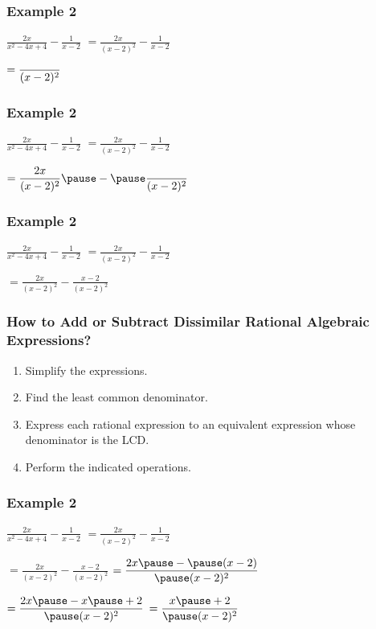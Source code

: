 \documentclass[14pt]{beamer}
\begin{document}
    \begin{frame}
    	\frametitle{Example 2}
    	$\displaystyle \frac{2x}{x^2-4x+4} - \frac{1}{x-2}$
    	$ = \displaystyle \frac{2x}{(x - 2)^2} - \frac{1}{x-2} $
    	
    	\pause \vspace{1em}\hspace{1em} $ = \displaystyle \frac{\text{\hspace{2em}}}{(x - 2)^2}$
    \end{frame}

    \begin{frame}
    	\frametitle{Example 2}
    	$\displaystyle \frac{2x}{x^2-4x+4} - \frac{1}{x-2}$
    	$ = \displaystyle \frac{2x}{(x - 2)^2} - \frac{1}{x-2} $
    	
    	\vspace{1em}\hspace{1em} $ = \displaystyle \frac{2x}{(x - 2)^2} \pause - \pause \frac{\void}{(x - 2)^2}$
    	
    \end{frame}

   \begin{frame}
  	\frametitle{Example 2}
  	$\displaystyle \frac{2x}{x^2-4x+4} - \frac{1}{x-2}$
  	$ = \displaystyle \frac{2x}{(x - 2)^2} - \frac{1}{x-2} $
  	
  	\vspace{1em}\hspace{1em} $ = \displaystyle \frac{2x}{(x - 2)^2} - \frac{x - 2}{(x - 2)^2}$
  	\end{frame}

    \begin{frame}
    	\frametitle{How to Add or Subtract Dissimilar Rational Algebraic Expressions?}
    	\begin{enumerate}
    		\item Simplify the expressions.
    		\item Find the least common denominator. 
    		\item Express each rational expression to an equivalent expression whose denominator is the LCD.
    		\item Perform the indicated operations.
    	\end{enumerate}
    \end{frame}

    \begin{frame}
    	\frametitle{Example 2}
    	$\displaystyle \frac{2x}{x^2-4x+4} - \frac{1}{x-2}$
    	$ = \displaystyle \frac{2x}{(x - 2)^2} - \frac{1}{x-2} $
    	
    	\vspace{1em}\hspace{1em} $ = \displaystyle \frac{2x}{(x - 2)^2} - \frac{x - 2}{(x - 2)^2}$
    	$ = \displaystyle \frac{2x \pause - \pause (x - 2)}{\pause (x - 2)^2} $
    	
    	\pause \vspace{1em}\hspace{1em} $ = \displaystyle \frac{2x \pause - x \pause + 2}{\pause (x - 2)^2} $
    	\pause $ = \displaystyle \frac{ x \pause + 2}{\pause (x - 2)^2} $
    \end{frame}
\end{document}
